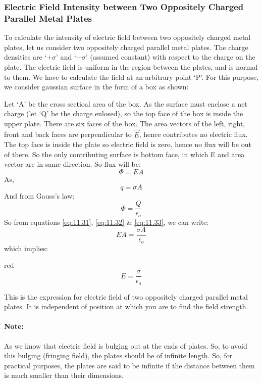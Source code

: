 \subsubsection{Electric Field Intensity between Two Oppositely Charged Parallel Metal Plates}
To calculate the intensity of electric field between two oppositely
charged metal plates, let us consider two oppositely charged parallel
metal plates. The charge densities are ‘$+\sigma$’ and ‘$-\sigma$’ (assumed constant)
with respect to the charge on the plate. The electric field is uniform
in the region between the plates, and is normal to them.
We have to calculate the field at an arbitrary point ‘P’.
For this purpose, we consider gaussian surface in the form of a box
as shown:

Let ‘A’ be the cross sectioal area of the box. As the surface
must enclose a net charge (let ‘Q’ be the charge enlosed),
so the top face of the box is inside the upper plate.
There are six faces of the box. The area vectors of the left, right,
front and back faces are perpendicular to $\vec{E}$, hence contributes
no electric flux. The top face is inside the plate so electric field is
zero, hence no flux will be out of there. So the only contributing surface
is bottom face, in which E and area vector are in same direction.
So flux will be:
\begin{equation}\label{eq:11.31}
  \Phi = EA 
\end{equation}
As, 
\begin{equation}\label{eq:11.32}
  q = \sigma A
\end{equation}
And from Gauss’s law:
\begin{equation}\label{eq:11.33}
  \Phi = \frac{Q}{\epsilon_{o}}
\end{equation}
So from equations \ref{eq:11.31}, \ref{eq:11.32} \& \ref{eq:11.33}, we can
write:
\begin{equation}
  EA = \frac{\sigma A}{\epsilon_{o}} \nonumber
\end{equation}
which implies:
\begin{mybox}{red}{}
\begin{equation}\label{eq:11.34}
  E = \frac{\sigma}{\epsilon_{o}}
\end{equation}
\end{mybox}
This is the expression for electric field of two oppositely charged
parallel metal plates. It is independent of position at which you
are to find the field strength.
\paragraph{Note:}
As we know that electric field is bulging out at the ends of plates.
So, to avoid this bulging (fringing field),
the plates should be of infinite length. So, for practical purposes,
the plates are said to be infinite if the distance between them is
much smaller than their dimensions.
